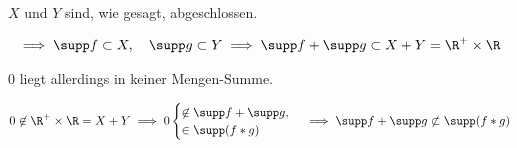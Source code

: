 \begin{solution}
$X$ und $Y$ sind, wie gesagt, abgeschlossen.

\begin{align*}
    \implies
    \supp f \subset X,
    \quad
    \supp g \subset Y
    \implies
    \supp f + \supp g \subset X + Y = \R^+ \times \R
\end{align*}

$0$ liegt allerdings in keiner Mengen-Summe.

\begin{align*}
    0 \not \in \R^+ \times \R = X + Y
    \implies
    0
    \begin{cases}
        \not \in \supp f + \supp g, \\
        \in \supp(f \ast g)
    \end{cases}
    \implies
    \supp f + \supp g
    \not \subset
    \supp(f \ast g)
\end{align*}

\end{solution}

